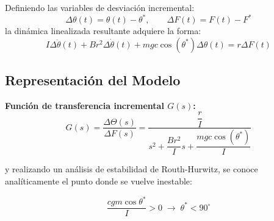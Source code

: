 Definiendo las variables de desviación incremental:
\begin{equation}
  \Delta \theta(t) = \theta(t) - \theta^*, \qquad \Delta F(t) = F(t) - F^*
\end{equation}
la dinámica linealizada resultante adquiere la forma:
\begin{equation}
  I \Delta \ddot{\theta}(t) + B r^2 \Delta \dot{\theta}(t) + m g c \cos(\theta^*) \Delta \theta(t) = r \Delta F(t)
  \label{eq:dinamica_linealizada}
\end{equation}

\subsection{Representación del Modelo}
\textbf{Función de transferencia incremental $G(s)$:}
  \begin{equation}
    G(s) = \frac{\Delta \Theta(s)}{\Delta F(s)} = \frac{\dfrac{r}{I}}{s^2 + \dfrac{B r^2}{I} s + \dfrac{m g c \cos(\theta^*)}{I}}
  \end{equation}

y realizando un análisis de estabilidad de Routh-Hurwitz, se conoce analíticamente el punto donde se vuelve inestable:

\[
\frac{cgm\cos\theta^*}{I} > 0
\;\longrightarrow\;
\theta^* < 90^\circ
\]